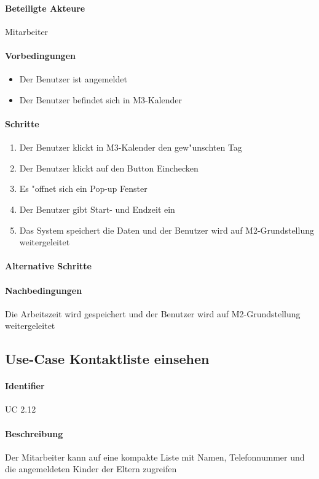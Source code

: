   \paragraph{Beteiligte Akteure}   \leavevmode \newline
    Mitarbeiter
  \paragraph{Vorbedingungen}
  \begin{itemize}
   \item Der Benutzer ist angemeldet
   \item Der Benutzer befindet sich in M3-Kalender
  \end{itemize}

  \paragraph{Schritte}
  \begin{enumerate}
   \item Der Benutzer klickt in M3-Kalender den gew"unschten Tag
   \item Der Benutzer klickt auf den Button \dq Einchecken\dq
   \item Es "offnet sich ein Pop-up Fenster
   \item Der Benutzer gibt Start- und Endzeit ein
   \item Das System speichert die Daten und der Benutzer wird auf M2-Grundstellung weitergeleitet
  \end{enumerate}

  \paragraph{Alternative Schritte}
  \paragraph{Nachbedingungen}
  Die Arbeitszeit wird gespeichert und der Benutzer wird auf M2-Grundstellung weitergeleitet
  
  \newpage
  \subsection{Use-Case Kontaktliste einsehen}
  \paragraph{Identifier}
  UC 2.12
  \paragraph{Beschreibung}
  Der Mitarbeiter kann auf eine kompakte Liste mit Namen, Telefonnummer und die angemeldeten Kinder der Eltern zugreifen 
